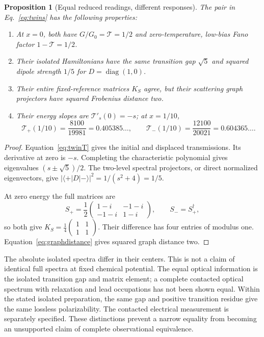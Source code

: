 \documentclass[11pt]{article}
\newtheorem{proposition}{Proposition}
\begin{document}
\begin{proposition}[Equal reduced readings, different responses]
The pair in Eq.~\eqref{eq:twins} has the following properties:
\begin{enumerate}[nosep]
\item At $x=0$, both have $G/G_0=\mathcal T=1/2$ and zero-temperature, low-bias Fano factor $1-\mathcal T=1/2$.
\item Their isolated Hamiltonians have the same transition gap $\sqrt5$ and squared dipole strength $1/5$ for $D=\operatorname{diag}(1,0)$.
\item Their entire fixed-reference matrices $K_S$ agree, but their scattering graph projectors have squared Frobenius distance two.
\item Their energy slopes are $\mathcal T'_s(0)=-s$; at $x=1/10$,
\begin{equation}
\mathcal T_+(1/10)=\frac{8100}{19981}=0.405385\ldots,\qquad
\mathcal T_-(1/10)=\frac{12100}{20021}=0.604365\ldots.
\end{equation}
\end{enumerate}
\end{proposition}
\begin{proof}
Equation~\eqref{eq:twinT} gives the initial and displaced transmissions. Its derivative at zero is $-s$. Completing the characteristic polynomial gives eigenvalues $(s\pm\sqrt5)/2$. The two-level spectral projectors, or direct normalized eigenvectors, give $|\langle +|D|-\rangle|^2=1/(s^2+4)=1/5$.

At zero energy the full matrices are
\begin{equation}
S_+=\frac12\begin{pmatrix}1-i&-1-i\\-1-i&1-i\end{pmatrix},\qquad
S_-=S_+^\dagger,
\end{equation}
so both give $K_S=\tfrac14\left(\begin{smallmatrix}1&1\\1&1\end{smallmatrix}\right)$. Their difference has four entries of modulus one. Equation~\eqref{eq:graphdistance} gives squared graph distance two.\end{proof}

The absolute isolated spectra differ in their centers. This is not a claim of identical full spectra at fixed chemical potential. The equal optical information is the isolated transition gap and matrix element; a complete contacted optical spectrum with relaxation and lead occupations has not been shown equal. Within the stated isolated preparation, the same gap and positive transition residue give the same lossless polarizability. The contacted electrical measurement is separately specified. These distinctions prevent a narrow equality from becoming an unsupported claim of complete observational equivalence.
\end{document}
